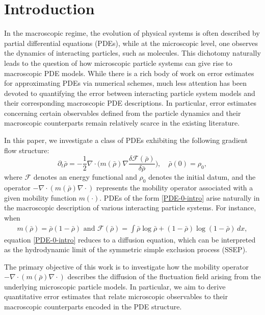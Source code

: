 \documentclass[UTF-8,reqno]{amsart}
\numberwithin{equation}{section}
\begin{document}
\setcounter{tocdepth}{1}
\tableofcontents




\section{Introduction}\label{sec-1}
In the macroscopic regime, the evolution of physical systems is often described by partial differential equations (PDEs), while at the microscopic level, one observes the dynamics of interacting particles, such as molecules. This dichotomy naturally leads to the question of how microscopic particle systems can give rise to macroscopic PDE models. While there is a rich body of work on error estimates for approximating PDEs via numerical schemes, much less attention has been devoted to quantifying the error between interacting particle system models and their corresponding macroscopic PDE descriptions. In particular, error estimates concerning certain observables defined from the particle dynamics and their macroscopic counterparts remain relatively scarce in the existing literature. 

In this paper, we investigate a class of PDEs exhibiting the following gradient flow structure:
\begin{equation}\label{PDE-0-intro}
\partial_t\bar{\rho}=-\frac{1}{2}\nabla\cdot\Big(m(\bar{\rho})\nabla\frac{\delta\mathcal{F}(\bar{\rho})}{\delta\bar{\rho}}\Big),\quad \bar{\rho}(0)=\rho_0, 
\end{equation}
where $\mathcal{F}$ denotes an energy functional and $\rho_0$ denotes the initial datum, and the operator $-\nabla\cdot(m(\bar{\rho})\nabla\cdot)$ represents the mobility operator associated with a given mobility function $m(\cdot)$. PDEs of the form \eqref{PDE-0-intro} arise naturally in the macroscopic description of various interacting particle systems. For instance, when 
\begin{align}\label{coefficient-ssep}
m(\bar{\rho})=\bar{\rho}(1-\bar{\rho}) \text{ and }  \mathcal{F}(\bar{\rho})=\int\bar{\rho}\log\bar{\rho}+(1-\bar{\rho})\log(1-\bar{\rho})\,dx, 
\end{align}
equation \eqref{PDE-0-intro} reduces to a diffusion equation, which can be interpreted as the hydrodynamic limit of the symmetric simple exclusion process (SSEP). 

The primary objective of this work is to investigate how the mobility operator $-\nabla\cdot(m(\bar{\rho})\nabla\cdot)$ describes the diffusion of the fluctuation field arising from the underlying microscopic particle models. In particular, we aim to derive quantitative error estimates that relate microscopic observables to their macroscopic counterparts encoded in the PDE structure.
\end{document}
